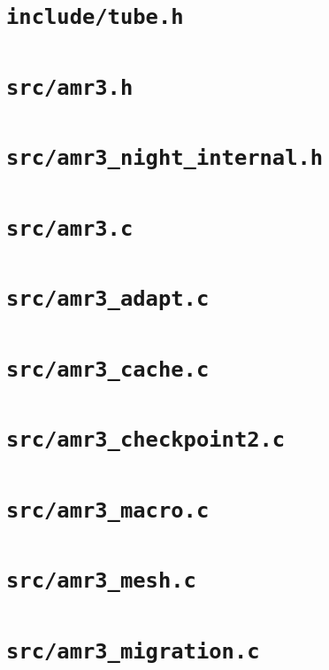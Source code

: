 \documentclass[9pt,a4paper]{extarticle}
\begin{document}
\section{\texttt{include/tube.h}}

\clearpage
\section{\texttt{src/amr3.h}}

\clearpage
\section{\texttt{src/amr3\_night\_internal.h}}

\clearpage
\section{\texttt{src/amr3.c}}

\clearpage
\section{\texttt{src/amr3\_adapt.c}}

\clearpage
\section{\texttt{src/amr3\_cache.c}}

\clearpage
\section{\texttt{src/amr3\_checkpoint2.c}}

\clearpage
\section{\texttt{src/amr3\_macro.c}}

\clearpage
\section{\texttt{src/amr3\_mesh.c}}

\clearpage
\section{\texttt{src/amr3\_migration.c}}

\clearpage
\end{document}
